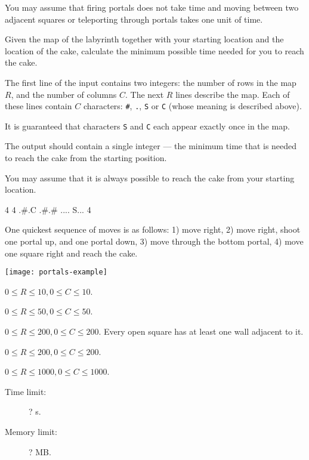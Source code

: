 \documentclass{boi2014}
\newcommand{\constant}[1]{{\tt #1}}
\begin{document}
    You may assume that firing portals does not take time and moving between two
    adjacent squares or teleporting through portals takes one unit of time.

    \Task
    Given the map of the labyrinth together with your starting location
    and the location of the cake, calculate the minimum possible time needed
    for you to reach the cake.

    \Input
    The first line of the input contains two integers: the number of rows
    in the map $R$, and the number of columns $C$. The next $R$ lines describe
    the map. Each of these lines contain $C$ characters: \constant{\#},
    \constant{.}, \constant{S} or \constant{C} (whose meaning is described
    above).

    It is guaranteed that characters \constant{S} and \constant{C} each appear
    exactly once in the map.

    \Output
    The output should contain a single integer --- the minimum time that
    is needed to reach the cake from the starting position.

    You may assume that it is always possible to reach the cake from your
    starting location.

    \Example
    \example
    {
        4 4\newline
        .\#.C\newline
        .\#.\#\newline
        ....\newline
        S...
    }
    {
        4
    }
    {
        One quickest sequence of moves is as follows: 1) move right, 2) move
        right, shoot one portal up, and one portal down, 3) move through the
        bottom portal, 4) move one square right and reach the cake.

        \begin{center}
            \texttt{[image: portals-example]}
        \end{center}
    }

    \Scoring

    \begin{description}[leftmargin=0pt]
        \item[Subtask 1 (? points):] $0 \le R \le 10, 0 \le C \le 10$.
        \item[Subtask 2 (? points):] $0 \le R \le 50, 0 \le C \le 50$.
        \item[Subtask 3 (? points):] $0 \le R \le 200, 0 \le C \le 200$.
        Every open square has at least one wall adjacent to it.
        \item[Subtask 4 (? points):] $0 \le R \le 200, 0 \le C \le 200$.
        \item[Subtask 5 (? points):] $0 \le R \le 1000, 0 \le C \le 1000$.
    \end{description}

    \Constraints

    \begin{description}
        \item[Time limit:] ? s.
        \item[Memory limit:] ? MB.
    \end{description}
\end{document}
